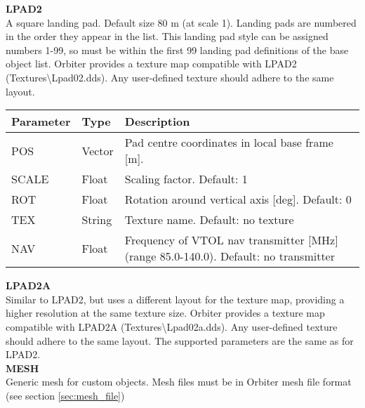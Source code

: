 \documentclass[Orbiter Developer Manual.tex]{subfiles}
\begin{document}
\noindent
\textbf{LPAD2}\\
A square landing pad. Default size 80 m (at scale 1). Landing pads are numbered in the order they appear in the list. This landing pad style can be assigned numbers 1-99, so must be within the first 99 landing pad definitions of the base object list. Orbiter provides a texture map compatible with LPAD2 (Textures\textbackslash Lpad02.dds). Any user-defined texture should adhere to the same layout.

	\begin{longtable}{ |p{}|p{}|p{}| }
	\hline\rule{0pt}{2ex}
	\textbf{Parameter} & \textbf{Type} & \textbf{Description}\\
	\hline\rule{0pt}{2ex}
	POS & Vector & Pad centre coordinates in local base frame [m].\\
	\hline\rule{0pt}{2ex}
	SCALE & Float & Scaling factor. Default: 1\\
	\hline\rule{0pt}{2ex}
	ROT & Float & Rotation around vertical axis [deg]. Default: 0\\
	\hline\rule{0pt}{2ex}
	TEX & String & Texture name. Default: no texture\\
	\hline\rule{0pt}{2ex}
	NAV & Float & Frequency of VTOL nav transmitter [MHz] (range 85.0-140.0). Default: no transmitter\\
	\hline
	\end{longtable}

\noindent
\textbf{LPAD2A}\\
Similar to LPAD2, but uses a different layout for the texture map, providing a higher resolution at the same texture size. Orbiter provides a texture map compatible with LPAD2A (Textures\textbackslash Lpad02a.dds). Any user-defined texture should adhere to the same layout. The supported parameters are the same as for LPAD2.\\


\noindent
\textbf{MESH}\\
Generic mesh for custom objects. Mesh files must be in Orbiter mesh file format (see section \ref{sec:mesh_file})
\end{document}
